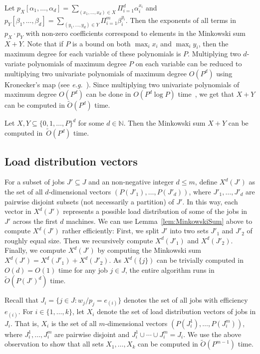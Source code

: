 \documentclass[11pt]{llncs}
\begin{document}
Let $p_X[\alpha_1,\ldots,\alpha_d] = \sum_{(x_1,\ldots,x_d) \in X} \Pi_{i=1}^d \alpha_i^{x_i}$ and $p_Y[\beta_1,\ldots,\beta_d] = \sum_{(y_1,\ldots,y_d) \in Y} \Pi_{i=1}^m \beta_i^{y_i}$. Then the exponents of all terms in $p_X \cdot p_Y$ with non-zero coefficients correspond to elements in the Minkowski sum $X + Y$. Note that if $P$ is a bound on both $\max_i x_i$ and $\max_i y_i$, then the maximum degree for each variable of these polynomials is $P$. Multiplying two $d$-variate polynomials of maximum degree $P$ on each variable can be reduced to multiplying two univariate polynomials of maximum degree $O(P^d)$ using Kronecker's map (see \emph{e.g.}~\cite{Pan94}). Since multiplying two univariate polynomials of maximum degree $O(P^d)$ can be done in $O(P^d \log P)$ time~\cite{CormenLRC2009}, we get that $X+Y$ can be computed in $\widetilde{O}(P^d)$ time.

\begin{lemma}
\label{lem:MinkowskiSum}%
Let  $X,Y \subseteq \{0,1,\ldots,P\}^d$ for some $d \in \mathbb{N}$. Then the Minkowski sum $X+Y$ can be computed in~$\widetilde{O}(P^d)$ time.     
\end{lemma}

\subsection{Load distribution vectors}

For a subset of jobs $J' \subseteq J$ and an non-negative integer $d \leq m$, define $X^d(J')$ as the set of all $d$-dimensional vectors $(P(J'_1),\ldots,P(J'_d))$,  where $J'_1,\ldots,J'_d$ are pairwise disjoint subsets (not necessarily a partition) of $J'$. In this way, each vector in $X^d(J')$ represents a possible load distribution of some of the jobs in~$J'$ across the first $d$ machines. We can use Lemma~\ref{lem:MinkowskiSum} above to compute $X^d(J')$ rather efficiently: First, we split $J'$ into two sets $J'_1$ and $J'_2$ of roughly equal size. Then we recursively compute $X^d(J'_1)$ and $X^d(J'_2)$. Finally, we compute $X^d(J')$ by computing the Minkowski sum $X^d(J')= X^d(J'_1) + X^d(J'_2)$. As $X^d(\{j\})$ can be trivially computed in $O(d)=O(1)$ time for any job $j\in J$, the entire algorithm runs in~$\widetilde{O}(P(J')^d)$ time. 

Recall that $J_i = \{j \in J : w_j/p_j = e_{(i)}\}$ denotes the set of all jobs with efficiency $e_{(i)}$. For $i \in \{1,\ldots,k\}$, let $X_i$ denote the set of load distribution vectors of jobs in $J_i$. That is, $X_i$ is the set of all $m$-dimensional vectors $(P(J^1_i),\ldots,P(J^m_i))$, where $J^1_i,\ldots,J^m_i$ are pairwise disjoint and $J^1_i \cup \cdots \cup J^m_i = J_i$. We use the above observation to show that all sets $X_1,\ldots,X_k$ can be computed in $\tilde{O}(P^{m-1})$ time.
\end{document}
